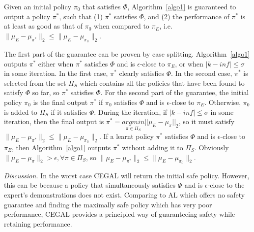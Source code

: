 \begin{theorem}
Given an initial policy $\pi_0$ that satisfies $\Phi$, Algorithm~\ref{algo1} is guaranteed to output a policy $\pi^*$, such that (1) $\pi^*$ satisfies $\Phi$, and 
(2) the performance of $\pi^*$ is at least as good as that of $\pi_0$ when compared to $\pi_E$, i.e. $\|\mu_E - \mu_{\pi^*}\|_2\leq\|\mu_E - \mu_{\pi_0}\|_2$. 
\end{theorem}
The first part of the guarantee can be proven by case splitting. 
Algorithm~\ref{algo1} outputs $\pi^*$ either when $\pi^*$ satisfies $\Phi$ and is {$\epsilon$-close} to $\pi_E$, or when $|k-inf|\leq \sigma$ in some iteration. 
In the first case, $\pi^*$ clearly satisfies $\Phi$. 
In the second case, $\pi^*$ is selected from the set $\Pi_S$ which contains all the policies that have been found to satisfy $\Phi$ so far, so $\pi^*$ satisfies $\Phi$.
For the second part of the guarantee, the initial policy $\pi_0$ is the final output $\pi^*$ if $\pi_0$ satisfies $\Phi$ and is {$\epsilon$-close} to $\pi_E$. 
Otherwise, $\pi_0$ is added to $\Pi_S$ if it satisfies $\Phi$.  
During the iteration, if $|k-inf|\leq \sigma$ in some iteration, then the final output is $\pi^*=\underset{{\pi}\in\Pi_S}{argmin}||\mu_E - \mu_{{\pi}}||_2$, so it must satisfy $\|\mu_E -  \mu_{\pi^*}\|_2\leq\|\mu_E - \mu_{\pi_0}\|_2$. 
If a learnt policy $\pi^*$ satisfies $\Phi$ and is {$\epsilon$-close} to $\pi_E$, then Algorithm~\ref{algo1} outputs $\pi^*$ without adding it to $\Pi_S$. Obviously $\|\mu_E - \mu_{{\pi}}\|_2>\epsilon, \forall{\pi}\in\Pi_S$, so $\|\mu_E -  \mu_{\pi^*}\|_2\leq\|\mu_E - \mu_{\pi_0}\|_2$.

\noindent
{\it Discussion.} In the worst case CEGAL will return the initial safe policy. However, this can be because a policy that simultaneously satisfies $\Phi$ and is $\epsilon$-close to the expert's demonstrations does not exist. Comparing to AL which offers no safety guarantee and finding the maximally safe policy which has very poor performance, CEGAL provides a principled way of guaranteeing safety while retaining performance.

\noindent
